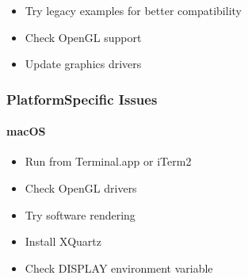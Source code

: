 \documentclass[a4paper,10pt,english,openany,oneside]{sphinxmanual}
\begin{document}
\begin{description}
\begin{itemize}
\item {} 
\sphinxAtStartPar
Try legacy examples for better compatibility

\item {} 
\sphinxAtStartPar
Check OpenGL support

\item {} 
\sphinxAtStartPar
Update graphics drivers

\end{itemize}

\end{description}


\subsubsection{Platform\sphinxhyphen{}Specific Issues}
\label{\detokenize{examples:platform-specific-issues}}

\paragraph{macOS}
\label{\detokenize{examples:macos}}\begin{description}
\begin{itemize}
\item {} 
\sphinxAtStartPar
Run from Terminal.app or iTerm2

\item {} 
\sphinxAtStartPar
Check OpenGL drivers

\item {} 
\sphinxAtStartPar
Try software rendering

\end{itemize}

\begin{itemize}
\item {} 
\sphinxAtStartPar
Install XQuartz

\item {} 
\sphinxAtStartPar
Check DISPLAY environment variable

\end{itemize}

\end{description}
\end{document}
